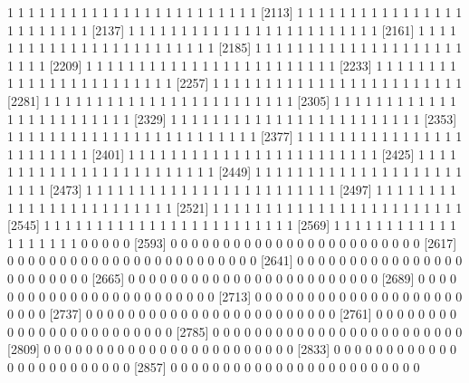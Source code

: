 \documentclass[11pt]{article}
\begin{document}
\begin{Schunk}
\begin{Soutput}
 [2089]  1  1  1  1  1  1  1  1  1  1  1  1  1  1  1  1  1  1  1  1  1  1  1  1
 [2113]  1  1  1  1  1  1  1  1  1  1  1  1  1  1  1  1  1  1  1  1  1  1  1  1
 [2137]  1  1  1  1  1  1  1  1  1  1  1  1  1  1  1  1  1  1  1  1  1  1  1  1
 [2161]  1  1  1  1  1  1  1  1  1  1  1  1  1  1  1  1  1  1  1  1  1  1  1  1
 [2185]  1  1  1  1  1  1  1  1  1  1  1  1  1  1  1  1  1  1  1  1  1  1  1  1
 [2209]  1  1  1  1  1  1  1  1  1  1  1  1  1  1  1  1  1  1  1  1  1  1  1  1
 [2233]  1  1  1  1  1  1  1  1  1  1  1  1  1  1  1  1  1  1  1  1  1  1  1  1
 [2257]  1  1  1  1  1  1  1  1  1  1  1  1  1  1  1  1  1  1  1  1  1  1  1  1
 [2281]  1  1  1  1  1  1  1  1  1  1  1  1  1  1  1  1  1  1  1  1  1  1  1  1
 [2305]  1  1  1  1  1  1  1  1  1  1  1  1  1  1  1  1  1  1  1  1  1  1  1  1
 [2329]  1  1  1  1  1  1  1  1  1  1  1  1  1  1  1  1  1  1  1  1  1  1  1  1
 [2353]  1  1  1  1  1  1  1  1  1  1  1  1  1  1  1  1  1  1  1  1  1  1  1  1
 [2377]  1  1  1  1  1  1  1  1  1  1  1  1  1  1  1  1  1  1  1  1  1  1  1  1
 [2401]  1  1  1  1  1  1  1  1  1  1  1  1  1  1  1  1  1  1  1  1  1  1  1  1
 [2425]  1  1  1  1  1  1  1  1  1  1  1  1  1  1  1  1  1  1  1  1  1  1  1  1
 [2449]  1  1  1  1  1  1  1  1  1  1  1  1  1  1  1  1  1  1  1  1  1  1  1  1
 [2473]  1  1  1  1  1  1  1  1  1  1  1  1  1  1  1  1  1  1  1  1  1  1  1  1
 [2497]  1  1  1  1  1  1  1  1  1  1  1  1  1  1  1  1  1  1  1  1  1  1  1  1
 [2521]  1  1  1  1  1  1  1  1  1  1  1  1  1  1  1  1  1  1  1  1  1  1  1  1
 [2545]  1  1  1  1  1  1  1  1  1  1  1  1  1  1  1  1  1  1  1  1  1  1  1  1
 [2569]  1  1  1  1  1  1  1  1  1  1  1  1  1  1  1  1  1  1  1  0  0  0  0  0
 [2593]  0  0  0  0  0  0  0  0  0  0  0  0  0  0  0  0  0  0  0  0  0  0  0  0
 [2617]  0  0  0  0  0  0  0  0  0  0  0  0  0  0  0  0  0  0  0  0  0  0  0  0
 [2641]  0  0  0  0  0  0  0  0  0  0  0  0  0  0  0  0  0  0  0  0  0  0  0  0
 [2665]  0  0  0  0  0  0  0  0  0  0  0  0  0  0  0  0  0  0  0  0  0  0  0  0
 [2689]  0  0  0  0  0  0  0  0  0  0  0  0  0  0  0  0  0  0  0  0  0  0  0  0
 [2713]  0  0  0  0  0  0  0  0  0  0  0  0  0  0  0  0  0  0  0  0  0  0  0  0
 [2737]  0  0  0  0  0  0  0  0  0  0  0  0  0  0  0  0  0  0  0  0  0  0  0  0
 [2761]  0  0  0  0  0  0  0  0  0  0  0  0  0  0  0  0  0  0  0  0  0  0  0  0
 [2785]  0  0  0  0  0  0  0  0  0  0  0  0  0  0  0  0  0  0  0  0  0  0  0  0
 [2809]  0  0  0  0  0  0  0  0  0  0  0  0  0  0  0  0  0  0  0  0  0  0  0  0
 [2833]  0  0  0  0  0  0  0  0  0  0  0  0  0  0  0  0  0  0  0  0  0  0  0  0
 [2857]  0  0  0  0  0  0  0  0  0  0  0  0  0  0  0  0  0  0  0  0  0  0  0  0

\end{Soutput}
\end{Schunk}
\end{document}
